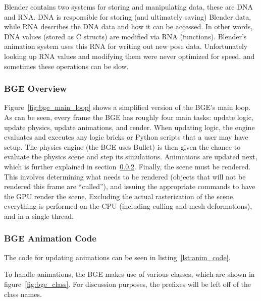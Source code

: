 Blender contains two systems for storing and manipulating data, these are DNA and RNA. DNA is responsible for storing (and ultimately saving) Blender data, while RNA describes the DNA data and how it can be accessed.
In other words, DNA values (stored as C structs) are modified via RNA (functions).
Blender's animation system uses this RNA for writing out new pose data.
Unfortunately looking up RNA values and modifying them were never optimized for speed, and sometimes these operations can be slow.

\subsubsection{BGE Overview}
\label{sec:bge_general_overview}


Figure~\ref{fig:bge_main_loop} shows a simplified version of the BGE's main loop.
As can be seen, every frame the BGE has roughly four main tasks: update logic, update physics, update animations, and render.
When updating logic, the engine evaluates and executes any logic bricks or Python scripts that a user may have setup.
The physics engine (the BGE uses Bullet) is then given the chance to evaluate the physics scene and step its simulations.
Animations are updated next, which is further explained in section~\ref{sec:bge_anim_overview}.
Finally, the scene must be rendered.
This involves determining what needs to be rendered (objects that will not be rendered this frame are ``culled''), and issuing the appropriate commands to have the GPU render the scene.
Excluding the actual rasterization of the scene, everything is performed on the CPU (including culling and mesh deformations), and in a single thread.

\subsubsection{BGE Animation Code}
\label{sec:bge_anim_overview}

The code for updating animations can be seen in listing~\ref{lst:anim_code}.


To handle animations, the BGE makes use of various classes, which are shown in figure~\ref{fig:bge_class}.
For discussion purposes, the prefixes will be left off of the class names.


